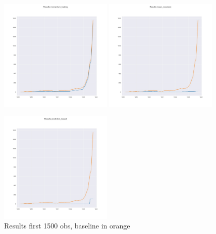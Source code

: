 \begin{figure}[h!]
    \centering
    \includegraphics[width=0.48\textwidth]{../results/train_momentum_trading_results.jpg}
    \includegraphics[width=0.48\textwidth]{../results/train_mean_reversion_results.jpg}

    \includegraphics[width=0.48\textwidth]{../results/train_prediction_based_results.jpg}

    \caption{Results first 1500 obs, baseline in orange}
    \label{2}
  
\end{figure}{}

